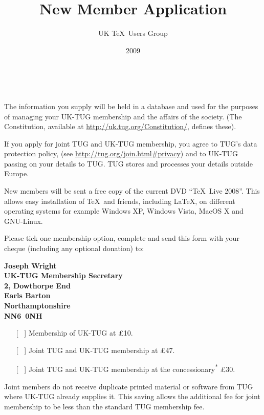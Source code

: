 \documentclass[a4paper,11pt]{article}
\title{New Member Application}
\author{UK \TeX\ Users Group}
\date{2009}
\begin{document}
\thispagestyle{empty}

\begin{minipage}{\textwidth}
  \makeatletter
  {\Large \@author}
  
  \smallskip
  
  {\large \@title\ \@date}
  
  \medskip
\end{minipage}

The information you supply will be held in a database and used
for the purposes of managing your UK-TUG membership and the 
affairs of the society. (The Constitution, available at
\url{http://uk.tug.org/Constitution/}, defines these).

If you apply for joint TUG and UK-TUG membership, you agree to 
TUG's data protection policy, (see 
\url{http://tug.org/join.html#privacy}) and to UK-TUG passing 
on your details to TUG. TUG stores and processes your details 
outside Europe.

New members will be sent a free copy of the current DVD ``\TeX\ 
Live 2008''. This allows easy installation of \TeX\ and friends, 
including \LaTeX, on different operating systems for example 
Windows XP, Windows Vista, MacOS X and GNU-Linux.  

Please tick one membership option, complete and send this form 
with your cheque (including any optional donation) to:

\begin{minipage}{\textwidth}
  \bfseries
  Joseph Wright\\
  UK-TUG Membership Secretary\\
  2, Dowthorpe End\\
  Earls Barton\\
  Northamptonshire\\
  NN6~0NH
\end{minipage}

\medskip

\begin{itemize}
  \item [[~]] Membership of UK-TUG at \pounds10.
  \item [[~]] Joint TUG and UK-TUG membership at \pounds47.
  \item [[~]] Joint TUG and UK-TUG membership at the 
    concessionary\textsuperscript{*} \pounds30.
\end{itemize} 
Joint members do not receive duplicate printed material or
software from TUG where UK-TUG already supplies it. This saving
allows the additional fee for joint membership to be less than the
standard TUG membership fee.
\end{document}

